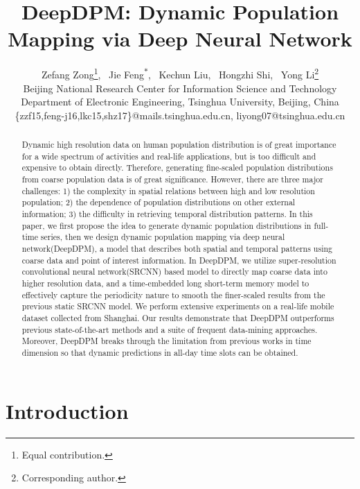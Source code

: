 \documentclass[letterpaper]{article} %
\begin{document}
\title{DeepDPM: Dynamic Population Mapping via Deep Neural Network}
\author{
Zefang Zong\thanks{Equal contribution.}, \  Jie Feng\textsuperscript{$\ast$},  \  Kechun Liu, \  Hongzhi Shi, \ Yong Li\thanks{Corresponding author.}\\
Beijing National Research Center for Information Science and Technology\\
Department of Electronic Engineering, Tsinghua University, Beijing, China\\
\{zzf15,feng-j16,lkc15,shz17\}@mails.tsinghua.edu.cn, liyong07@tsinghua.edu.cn\\}

\maketitle
\begin{abstract}
Dynamic high resolution data on human population distribution is of great importance for a wide spectrum of activities and real-life applications, but is too difficult and expensive to obtain directly. Therefore, generating fine-scaled population distributions from coarse population data is of great significance. However, there are three major challenges: 1) the complexity in spatial relations between high and low resolution population; 2) the dependence of population distributions on other external information; 3) the difficulty in retrieving temporal distribution patterns. In this paper, we first propose the idea to generate dynamic population distributions in full-time series, then we design dynamic population mapping via deep neural network(DeepDPM), a model that describes both spatial and temporal patterns using coarse data and point of interest information. In DeepDPM, we utilize super-resolution convolutional neural network(SRCNN) based model to directly map coarse data into higher resolution data, and a time-embedded long short-term memory model to effectively capture the periodicity nature to smooth the finer-scaled results from the previous static SRCNN model. We perform extensive experiments on a real-life mobile dataset collected from Shanghai. Our results demonstrate that DeepDPM outperforms previous state-of-the-art methods and a suite of frequent data-mining approaches. Moreover, DeepDPM breaks through the limitation from previous works in time dimension so that dynamic predictions in all-day time slots can be obtained.
\end{abstract}


\section{Introduction}
\end{document}
